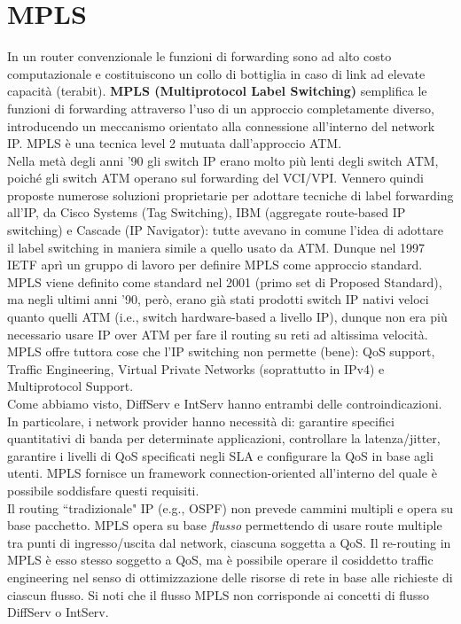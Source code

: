 \section{MPLS}
In un router convenzionale le funzioni di forwarding sono ad alto costo computazionale e costituiscono un collo di bottiglia in caso di link ad elevate capacità (terabit). \textbf{MPLS (Multiprotocol Label Switching)} semplifica le funzioni di forwarding attraverso l'uso di un approccio completamente diverso, introducendo un meccanismo orientato alla connessione all'interno del network IP. MPLS è una tecnica level 2 mutuata dall'approccio ATM.\\
Nella metà degli anni '90 gli switch IP erano molto più lenti degli switch ATM, poiché gli switch ATM operano sul forwarding del VCI/VPI. Vennero quindi proposte numerose soluzioni proprietarie per adottare tecniche di label forwarding all'IP, da Cisco Systems (Tag Switching), IBM (aggregate route-based IP switching) e Cascade (IP Navigator): tutte avevano in comune l'idea di adottare il label switching in maniera simile a quello usato da ATM. Dunque nel 1997 IETF aprì un gruppo di lavoro per definire MPLS come approccio standard. MPLS viene definito come standard nel 2001 (primo set di Proposed Standard), ma negli ultimi anni '90, però, erano già stati prodotti switch IP nativi veloci quanto quelli ATM (i.e., switch hardware-based a livello IP), dunque non era più necessario usare IP over ATM per fare il routing su reti ad altissima velocità. MPLS offre tuttora cose che l'IP switching non permette (bene): QoS support, Traffic Engineering, Virtual Private Networks (soprattutto in IPv4) e Multiprotocol Support.\\
Come abbiamo visto, DiffServ e IntServ hanno entrambi delle controindicazioni. In particolare, i network provider hanno necessità di: garantire specifici quantitativi di banda per determinate applicazioni, controllare la latenza/jitter, garantire i livelli di QoS specificati negli SLA e configurare la QoS in base agli utenti. MPLS fornisce un framework connection-oriented all'interno del quale è possibile soddisfare questi requisiti.\\
Il routing \textquotedblleft tradizionale" IP (e.g., OSPF) non prevede cammini multipli e opera su base pacchetto. MPLS opera su base \textit{flusso} permettendo di usare route multiple tra punti di ingresso/uscita dal network, ciascuna soggetta a QoS. Il re-routing in MPLS è esso stesso soggetto a QoS, ma è possibile  operare il cosiddetto traffic engineering nel senso di ottimizzazione delle risorse di rete in base alle richieste di ciascun flusso. Si noti che il flusso MPLS non corrisponde ai concetti di flusso DiffServ o IntServ.\\
